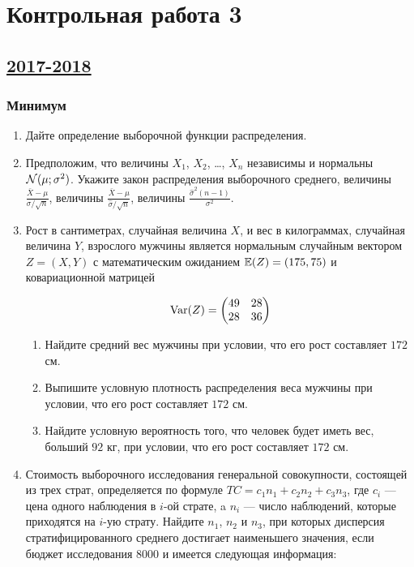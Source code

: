 \newpage
\section{Контрольная работа 3}


\subsection[2017-2018]{\hyperref[sec:sol_kr_03_2017_2018]{2017-2018}}
\label{sec:kr_03_2017_2018}



	\subsubsection*{Минимум}

	\begin{enumerate}
	\item Дайте определение выборочной функции распределения.
	\item Предположим, что величины $X_1$, $X_2$, \ldots, $X_n$ независимы и нормальны $\mathcal{N}(\mu;\sigma^2)$. Укажите закон распределения выборочного среднего, величины $\frac{\bar X - \mu}{\sigma/\sqrt{n}}$, величины $\frac{\bar X - \mu}{\hat\sigma/\sqrt{n}}$, величины $\frac{\hat\sigma^2(n-1)}{\sigma^2}$.
	\item Рост в сантиметрах, случайная величина $X$, и вес в килограммах, случайная величина $Y$, взрослого мужчины является нормальным случайным вектором $Z = (X, Y)$ с математическим ожиданием $\operatorname{\mathbb{E}}(Z) = (175, 75)$ и ковариационной матрицей

	\[
	\operatorname{Var}(Z) =
	\begin{pmatrix}
	49 & 28 \\
	28 & 36
	\end{pmatrix}
	\]

	\begin{enumerate}
		\item Найдите средний вес мужчины при условии, что его рост составляет $172$ см.
		\item Выпишите условную плотность распределения веса мужчины при условии, что его рост составляет $172$ см.
		\item Найдите условную вероятность того, что человек будет иметь вес, больший $92$ кг, при условии, что его рост составляет $172$ см.
	\end{enumerate}

	\item Стоимость выборочного исследования генеральной совокупности, состоящей из трех страт, определяется по формуле $TC = c_1n_1 + c_2n_2 + c_3n_3$, где $c_i$ — цена одного наблюдения в $i$-ой страте, a $n_i$ — число наблюдений, которые приходятся на $i$-ую страту. Найдите $n_1$, $n_2$ и $n_3$, при которых дисперсия стратифицированного среднего достигает наименьшего значения, если бюджет исследования 8000 и имеется следующая информация:


\end{enumerate}
